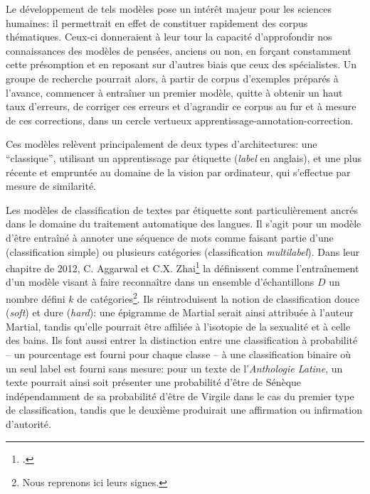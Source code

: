 Le développement de tels modèles pose un intérêt majeur pour les sciences humaines: il permettrait en effet de constituer rapidement des corpus thématiques. Ceux-ci donneraient à leur tour la capacité d'approfondir nos connaissances des modèles de pensées, anciens ou non, en forçant constamment cette présomption et en reposant sur d'autres biais que ceux des spécialistes. Un groupe de recherche pourrait alors, à partir de corpus d'exemples préparés à l'avance, commencer à entraîner un premier modèle, quitte à obtenir un haut taux d'erreurs, de corriger ces erreurs et d'agrandir ce corpus au fur et à mesure de ces corrections, dans un cercle vertueux apprentissage-annotation-correction. 

Ces modèles relèvent principalement de deux types d'architectures: une \enquote{classique}, utilisant un apprentissage par étiquette (\textit{label} en anglais), et une plus récente et empruntée au domaine de la vision par ordinateur, qui s'effectue par mesure de similarité.

Les modèles de classification de textes par étiquette sont particulièrement ancrés dans le domaine du traitement automatique des langues. Il s'agit pour un modèle d'être entraîné à annoter une séquence de mots comme faisant partie d'une (classification simple) ou plusieurs catégories (classification \textit{multilabel}). Dans leur chapitre de 2012, C. Aggarwal et C.X. Zhai\footcite{aggarwal_survey_2012} la définissent comme l'entraînement d'un modèle visant à faire reconnaître dans un ensemble d'échantillons $D$ un nombre défini $k$ de catégories\footnote{Nous reprenons ici leurs signes.}. Ils réintroduisent la notion de classification douce (\textit{soft}) et dure (\textit{hard}): une épigramme de Martial serait ainsi attribuée à l'auteur Martial, tandis qu'elle pourrait être affiliée à l'isotopie de la sexualité et à celle des bains. Ils font aussi entrer la distinction entre une classification à probabilité -- un pourcentage est fourni pour chaque classe -- à une classification binaire où un seul label est fourni sans mesure: pour un texte de l'\textit{Anthologie Latine}, un texte pourrait ainsi soit présenter une probabilité d'être de Sénèque indépendamment de sa probabilité d'être de Virgile dans le cas du premier type de classification, tandis que le deuxième produirait une affirmation ou infirmation d'autorité.

